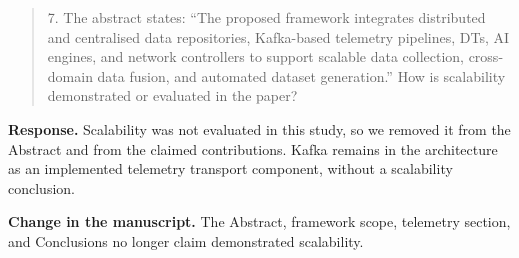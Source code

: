 \documentclass[11pt]{article}
\newenvironment{reviewercomment}{\begin{quote}\color{reviewblue}}{\end{quote}}
\newenvironment{authorresponse}{\color{responsegreen}\textbf{Response.} }{\par\color{black}}
\newcommand{\change}[1]{\par\textbf{Change in the manuscript.} #1\par}
\begin{document}
\begin{reviewercomment}
7. The abstract states: ``The proposed framework integrates distributed and centralised data repositories, Kafka-based telemetry pipelines, DTs, AI engines, and network controllers to support scalable data collection, cross-domain data fusion, and automated dataset generation.'' How is scalability demonstrated or evaluated in the paper?
\end{reviewercomment}
\begin{authorresponse}
Scalability was not evaluated in this study, so we removed it from the Abstract and from the claimed contributions. Kafka remains in the architecture as an implemented telemetry transport component, without a scalability conclusion.
\end{authorresponse}
\change{The Abstract, framework scope, telemetry section, and Conclusions no longer claim demonstrated scalability.}
\end{document}
